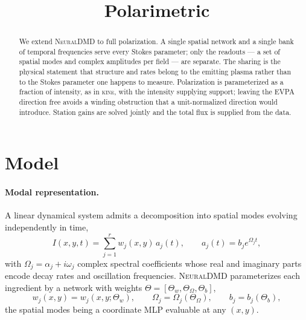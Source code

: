 \documentclass[11pt]{article}
\title{Polarimetric \neuralDMD}
\author{}
\date{}
\newcommand{\neuralDMD}{\textsc{\small{NeuralDMD}}\xspace}
\newcommand{\kine}{\textsc{\small{kine}}\xspace}
\begin{document}
\maketitle
\vspace{-8ex}

\begin{abstract}
\noindent
We extend \neuralDMD to full polarization. A single spatial network and a single
bank of temporal frequencies serve every Stokes parameter; only the readouts --- a
set of spatial modes and complex amplitudes per field --- are separate. The sharing
is the physical statement that structure and rates belong to the emitting plasma
rather than to the Stokes parameter one happens to measure. Polarization is parameterized as a fraction of intensity, as in \kine, with the
intensity supplying support; leaving the EVPA direction free avoids a winding
obstruction that a unit-normalized direction would introduce. Station gains are
solved jointly and the total flux is supplied from the data.
\end{abstract}

\section{Model}

\paragraph{Modal representation.}
A linear dynamical system admits a decomposition into spatial modes evolving
independently in time,
\begin{equation}
  I(x,y,t)=\sum_{j=1}^{r} w_j(x,y)\, a_j(t),
  \qquad a_j(t) = b_j e^{\Omega_j t},
  \label{eq:modal}
\end{equation}
with $\Omega_j = \alpha_j + i\omega_j$ complex spectral coefficients whose real and
imaginary parts encode decay rates and oscillation frequencies. \neuralDMD
parameterizes each ingredient by a network with weights
$\Theta=[\Theta_w,\Theta_\Omega,\Theta_b]$,
\begin{equation}
  w_j(x,y) = w_j(x,y;\Theta_w), \qquad
  \Omega_j = \Omega_j(\Theta_\Omega), \qquad
  b_j = b_j(\Theta_b),
  \label{eq:params}
\end{equation}
the spatial modes being a coordinate MLP evaluable at any $(x,y)$.
\end{document}
